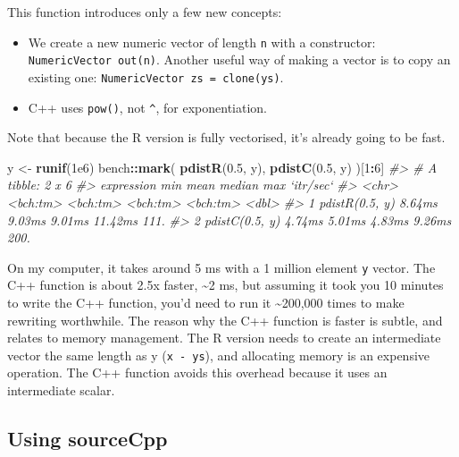 \documentclass[]{book}
\newenvironment{Shaded}{\begin{snugshade}}{\end{snugshade}}
\newcommand{\CommentTok}[1]{\textcolor[rgb]{0.37,0.37,0.37}{\textit{#1}}}
\newcommand{\DecValTok}[1]{\textcolor[rgb]{0.06,0.06,0.06}{#1}}
\newcommand{\FloatTok}[1]{\textcolor[rgb]{0.06,0.06,0.06}{#1}}
\newcommand{\KeywordTok}[1]{\textcolor[rgb]{0.27,0.27,0.27}{\textbf{#1}}}
\newcommand{\NormalTok}[1]{#1}
\newcommand{\OperatorTok}[1]{\textcolor[rgb]{0.43,0.43,0.43}{\textbf{#1}}}
\newcommand{\StringTok}[1]{\textcolor[rgb]{0.5,0.5,0.5}{#1}}
\begin{document}
This function introduces only a few new concepts:

\begin{itemize}
\item
  We create a new numeric vector of length \texttt{n} with a constructor:
  \texttt{NumericVector\ out(n)}. Another useful way of making a vector is to copy an
  existing one: \texttt{NumericVector\ zs\ =\ clone(ys)}.
\item
  C++ uses \texttt{pow()}, not \texttt{\^{}}, for exponentiation.
\end{itemize}

Note that because the R version is fully vectorised, it's already going to be fast.

\begin{Shaded}
\begin{Highlighting}[]
\NormalTok{y <-}\StringTok{ }\KeywordTok{runif}\NormalTok{(}\FloatTok{1e6}\NormalTok{)}
\NormalTok{bench}\OperatorTok{::}\KeywordTok{mark}\NormalTok{(}
  \KeywordTok{pdistR}\NormalTok{(}\FloatTok{0.5}\NormalTok{, y),}
  \KeywordTok{pdistC}\NormalTok{(}\FloatTok{0.5}\NormalTok{, y)}
\NormalTok{)[}\DecValTok{1}\OperatorTok{:}\DecValTok{6}\NormalTok{]}
\CommentTok{#> # A tibble: 2 x 6}
\CommentTok{#>   expression          min     mean   median      max `itr/sec`}
\CommentTok{#>   <chr>          <bch:tm> <bch:tm> <bch:tm> <bch:tm>     <dbl>}
\CommentTok{#> 1 pdistR(0.5, y)   8.64ms   9.03ms   9.01ms  11.42ms      111.}
\CommentTok{#> 2 pdistC(0.5, y)   4.74ms   5.01ms   4.83ms   9.26ms      200.}
\end{Highlighting}
\end{Shaded}

On my computer, it takes around 5 ms with a 1 million element \texttt{y} vector. The C++ function is about 2.5x faster, \textasciitilde{}2 ms, but assuming it took you 10 minutes to write the C++ function, you'd need to run it \textasciitilde{}200,000 times to make rewriting worthwhile. The reason why the C++ function is faster is subtle, and relates to memory management. The R version needs to create an intermediate vector the same length as y (\texttt{x\ -\ ys}), and allocating memory is an expensive operation. The C++ function avoids this overhead because it uses an intermediate scalar.

\hypertarget{sourceCpp}{%
\subsection{Using sourceCpp}\label{sourceCpp}}
\end{document}
